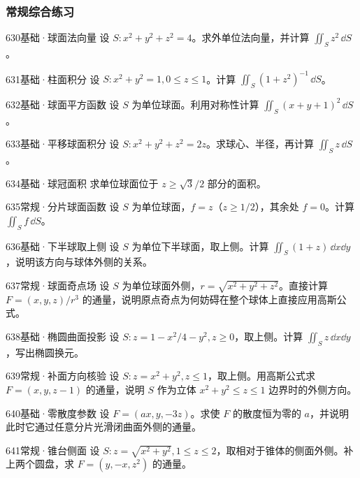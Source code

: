 \subsubsection{常规综合练习}
\begin{exercise}{630}{基础·球面法向量}
设 $S:x^2+y^2+z^2=4$。求外单位法向量，并计算 $\iint_Sz^2\,\dd S$。
\end{exercise}
\begin{exercise}{631}{基础·柱面积分}
设 $S:x^2+y^2=1,0\leq z\leq1$。计算 $\iint_S(1+z^2)^{-1}\,\dd S$。
\end{exercise}
\begin{exercise}{632}{基础·球面平方函数}
设 $S$ 为单位球面。利用对称性计算 $\iint_S(x+y+1)^2\,\dd S$。
\end{exercise}
\begin{exercise}{633}{基础·平移球面积分}
设 $S:x^2+y^2+z^2=2z$。求球心、半径，再计算 $\iint_Sz\,\dd S$。
\end{exercise}
\begin{exercise}{634}{基础·球冠面积}
求单位球面位于 $z\geq\sqrt3/2$ 部分的面积。
\end{exercise}
\begin{exercise}{635}{常规·分片球面函数}
设 $S$ 为单位球面，$f=z$（$z\geq1/2$），其余处 $f=0$。计算 $\iint_Sf\,\dd S$。
\end{exercise}
\begin{exercise}{636}{基础·下半球取上侧}
设 $S$ 为单位下半球面，取上侧。计算 $\iint_S(1+z)\,\dd x\dd y$，说明该方向与球体外侧的关系。
\end{exercise}
\begin{exercise}{637}{常规·球面奇点场}
设 $S$ 为单位球面外侧，$r=\sqrt{x^2+y^2+z^2}$。直接计算 $F=(x,y,z)/r^3$ 的通量，说明原点奇点为何妨碍在整个球体上直接应用高斯公式。
\end{exercise}
\begin{exercise}{638}{基础·椭圆曲面投影}
设 $S:z=1-x^2/4-y^2,z\geq0$，取上侧。计算 $\iint_Sz\,\dd x\dd y$，写出椭圆换元。
\end{exercise}
\begin{exercise}{639}{常规·补面方向核验}
设 $S:z=x^2+y^2,z\leq1$，取上侧。用高斯公式求 $F=(x,y,z-1)$ 的通量，说明 $S$ 作为立体 $x^2+y^2\leq z\leq1$ 边界时的外侧方向。
\end{exercise}
\begin{exercise}{640}{基础·零散度参数}
设 $F=(ax,y,-3z)$。求使 $F$ 的散度恒为零的 $a$，并说明此时它通过任意分片光滑闭曲面外侧的通量。
\end{exercise}
\begin{exercise}{641}{常规·锥台侧面}
设 $S:z=\sqrt{x^2+y^2},1\leq z\leq2$，取相对于锥体的侧面外侧。补上两个圆盘，求 $F=(y,-x,z^2)$ 的通量。
\end{exercise}
